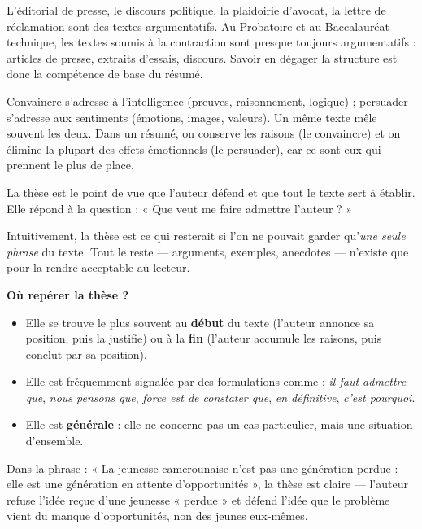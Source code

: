 \documentclass[11pt]{article}
\newcommand{\cle}[1]{{\popxbold\color{popdark}#1}}
\newcounter{popsec}
\newcounter{popsub}
\newcommand{\courssub}[1]{%
  \stepcounter{popsub}%
  \par\vspace{9pt}\noindent{\popxbold\fontsize{11.5}{13}\selectfont\color{popink}{\color{poporange}\thepopsec.\thepopsub}\hspace{6pt}#1}\par\nopagebreak\vspace{4pt}
}
\begin{document}
L'éditorial de presse, le discours politique, la plaidoirie d'avocat, la lettre de réclamation sont des textes argumentatifs. Au Probatoire et au Baccalauréat technique, les textes soumis à la contraction sont presque toujours argumentatifs : articles de presse, extraits d'essais, discours. Savoir en dégager la structure est donc la compétence de base du résumé.

\begin{attention}
Convaincre s'adresse à l'intelligence (preuves, raisonnement, logique) ; persuader s'adresse aux sentiments (émotions, images, valeurs). Un même texte mêle souvent les deux. Dans un résumé, on conserve les raisons (le convaincre) et on élimine la plupart des effets émotionnels (le persuader), car ce sont eux qui prennent le plus de place.
\end{attention}

\courssub{La thèse : l'idée principale défendue}

\begin{definition}[Thèse]
La \cle{thèse} est le point de vue que l'auteur défend et que tout le texte sert à établir. Elle répond à la question : « Que veut me faire admettre l'auteur ? »
\end{definition}

Intuitivement, la thèse est ce qui resterait si l'on ne pouvait garder qu'\emph{une seule phrase} du texte. Tout le reste — arguments, exemples, anecdotes — n'existe que pour la rendre acceptable au lecteur.

\textbf{Où repérer la thèse ?}
\begin{itemize}
\item Elle se trouve le plus souvent au \textbf{début} du texte (l'auteur annonce sa position, puis la justifie) ou à la \textbf{fin} (l'auteur accumule les raisons, puis conclut par sa position).
\item Elle est fréquemment signalée par des formulations comme : \emph{il faut admettre que}, \emph{nous pensons que}, \emph{force est de constater que}, \emph{en définitive}, \emph{c'est pourquoi}.
\item Elle est \textbf{générale} : elle ne concerne pas un cas particulier, mais une situation d'ensemble.
\end{itemize}

\begin{exemplebox}
Dans la phrase : « La jeunesse camerounaise n'est pas une génération perdue : elle est une génération en attente d'opportunités », la thèse est claire — l'auteur refuse l'idée reçue d'une jeunesse « perdue » et défend l'idée que le problème vient du manque d'opportunités, non des jeunes eux-mêmes.
\end{exemplebox}
\end{document}
